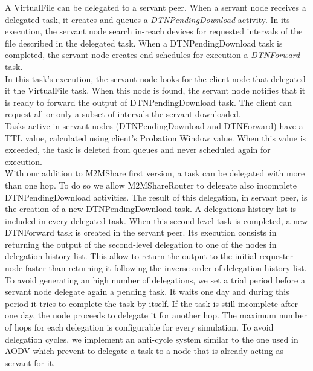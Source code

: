 A VirtualFile can be delegated to a servant peer. When a servant node receives a delegated task, it creates and queues a \textit{DTNPendingDownload} activity. In its execution, the servant node search in-reach devices for requested intervals of the file described in the delegated task. When a DTNPendingDownload task is completed, the servant node creates end schedules for execution a \textit{DTNForward} task.
\\

In this task's execution, the servant node looks for the client node that delegated it the VirtualFile task. When this node is found, the servant node notifies that it is ready to forward the output of DTNPendingDownload task. The client can request all or only a subset of intervals the servant downloaded.
\\

Tasks active in servant nodes (DTNPendingDownload and DTNForward) have a TTL value, calculated using client's Probation Window value. When this value is exceeded, the task is deleted from queues and never scheduled again for execution.
\\

With our addition to M2MShare first version, a task can be delegated with more than one hop. To do so we allow M2MShareRouter to delegate also incomplete DTNPendingDownload activities. The result of this delegation, in servant peer, is the creation of a new DTNPendingDownload task. A delegations history list is included in every delegated task. When this second-level task is completed, a new DTNForward task is created in the servant peer. Its execution consists in returning the output of the second-level delegation to one of the nodes in delegation history list. This allow to return the output to the initial requester node faster than returning it following the inverse order of delegation history list.
\\

To avoid generating an high number of delegations, we set a trial period before a servant node delegate again a pending task. It waits one day and during this period it tries to complete the task by itself. If the task is still incomplete after one day, the node proceeds to delegate it for another hop. The maximum number of hops for each delegation is configurable for every simulation. To avoid delegation cycles, we implement an anti-cycle system similar to the one used in AODV \cite{aodv} which prevent to delegate a task to a node that is already acting as servant for it. 

